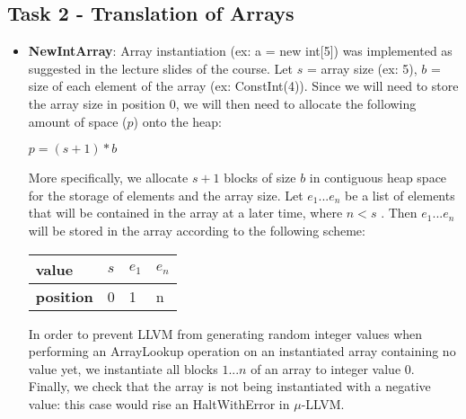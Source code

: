 \documentclass[paper=a4, fontsize=11pt]{scrartcl}
\numberwithin{equation}{section}		%
\numberwithin{figure}{section}			%
\numberwithin{table}{section}				%
\begin{document}
\subsection*{Task 2 - Translation of Arrays}
\begin{itemize}

\item \textbf{NewIntArray}: Array instantiation (ex: a = new int[5]) was implemented as suggested in the lecture slides of the course. Let $s$ = array size (ex: 5), $b$ = size of each element of the array (ex: ConstInt(4)). Since we will need to store the array size in position 0, we will then need to allocate the following amount of space ($p$) onto the heap:\\
\begin{center}
 $p = (s + 1) * b$
\end{center}
More specifically, we allocate $s + 1$ blocks of size $b$ in contiguous heap space for the storage of elements and the array size. Let $e_1... e_n$ be a list of elements that will be contained in the array at a later time, where $n < s$ . Then $e_1... e_n$ will be stored in the array according to the following scheme:
\begin{center}
\begin{table}[h]
\centering
\begin{tabular}{|l|l|l|l|}
\hline
\textbf{value}    & $s$ & $e_1$ & $e_n$ \\ \hline
\textbf{position} & 0      & 1  & n  \\ \hline
\end{tabular}
\end{table}
\end{center}
In order to prevent LLVM from generating random integer values when performing an ArrayLookup operation on an instantiated array containing no value yet, we instantiate all blocks $1...n$ of an array to integer value 0. 
Finally, we check that the array is not being instantiated with a negative value: this case would rise an HaltWithError in $\mu$-LLVM. 


\end{itemize}
\end{document}
